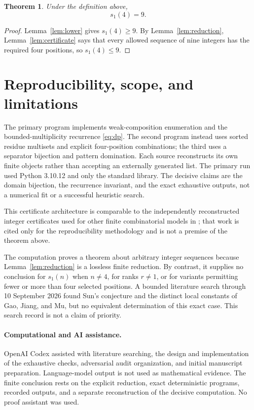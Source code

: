 \documentclass[11pt]{article}
\newtheorem{theorem}{Theorem}
\begin{document}
\begin{theorem}
Under the definition above,
\[
  s_1(4)=9.
\]
\end{theorem}

\begin{proof}
Lemma~\ref{lem:lower} gives $s_1(4)\geq9$.  By
Lemma~\ref{lem:reduction}, Lemma~\ref{lem:certificate} says that every
allowed sequence of nine integers has the required four positions, so
$s_1(4)\leq9$.
\end{proof}

\section{Reproducibility, scope, and limitations}

The primary program implements weak-composition enumeration and the
bounded-multiplicity recurrence \eqref{eq:dp}.  The second program instead
uses sorted residue multisets and explicit four-position combinations;
the third uses a separator bijection and pattern domination.  Each source
reconstructs its own finite objects rather than accepting an externally
generated list.  The primary run used Python 3.10.12 and only the standard
library.  The decisive claims are the domain bijection, the recurrence
invariant, and the exact exhaustive outputs, not a numerical fit or a
successful heuristic search.

This certificate architecture is comparable to the independently
reconstructed integer certificates used for other finite combinatorial
models in \cite{ZengEtAl2026FiniteCertificates}; that work is cited only
for the reproducibility methodology and is not a premise of the theorem
above.

The computation proves a theorem about arbitrary integer sequences
because Lemma~\ref{lem:reduction} is a lossless finite reduction.  By
contrast, it supplies no conclusion for $s_1(n)$ when $n\neq4$, for ranks
$r\neq1$, or for variants permitting fewer or more than four selected
positions.  A bounded literature search through 10 September 2026 found
Sun's conjecture and the distinct local constants of Gao, Jiang, and Mu,
but no equivalent determination of this exact case.  This search record
is not a claim of priority.

\paragraph{Computational and AI assistance.}
OpenAI Codex assisted with literature searching, the design and
implementation of the exhaustive checks, adversarial audit organization,
and initial manuscript preparation.  Language-model output is not used as
mathematical evidence.  The finite conclusion rests on the explicit
reduction, exact deterministic programs, recorded outputs, and a separate
reconstruction of the decisive computation.  No proof assistant was used.



\end{document}
